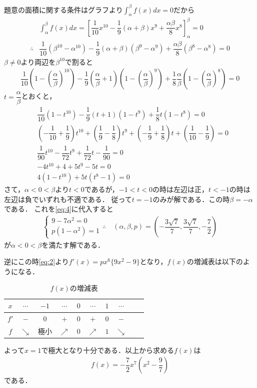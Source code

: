 \documentclass[../../main.tex]{subfiles}
\begin{document}
題意の面積に関する条件はグラフより$\displaystyle \int_\alpha^\beta f(x)dx=0$だから
\begin{align}
  &\int_\alpha^\beta f(x)dx
  =  \left[\dfrac{1}{10}x^{10}-\dfrac{1}{9}(\alpha+\beta)x^9+\dfrac{\alpha\beta}{8}x^8\right]_\alpha^\beta =0 \\
  \therefore
  & \dfrac{1}{10}(\beta^{10}-\alpha^{10})-\dfrac{1}{9}(\alpha+\beta)(\beta^9-\alpha^9)+\dfrac{\alpha\beta}{8}(\beta^8-\alpha^8)=0
\end{align}
$\beta\neq 0$より両辺を$\beta^{10}$で割ると
\begin{align}
  \dfrac{1}{10}(1-\left(\dfrac{\alpha}{\beta}\right)^{10})-\dfrac{1}{9}(\dfrac{\alpha}{\beta}+1)(1-\left(\dfrac{\alpha}{\beta}\right)^{9})+\dfrac{1}{8}\dfrac{\alpha}{\beta}(1-\left(\dfrac{\alpha}{\beta}\right)^{8})=0
\end{align}
$t=\dfrac{\alpha}{\beta}$とおくと，
\begin{align}
  & \dfrac{1}{10}(1-t^{10})-\dfrac{1}{9}(t+1)(1-t^{9})+\dfrac{1}{8}t(1-t^{8})=0 \\
  & \left(-\dfrac{1}{10}+\dfrac{1}{9}\right)t^{10} +\left(\dfrac{1}{9}-\dfrac{1}{8}\right)t^{9}+\left(-\dfrac{1}{9}+\dfrac{1}{8}\right)t +\left(\dfrac{1}{10}-\dfrac{1}{9}\right) = 0 \\
  & \dfrac{1}{90}t^{10} - \dfrac{1}{72}t^{9} + \dfrac{1}{72}t - \dfrac{1}{90} = 0 \\
  & -4t^{10}+4+5t^9-5t=0 \\
  & 4(1-t^{10})+5t(t^8-1)=0
\end{align}
さて，$\alpha<0<\beta$より$t<0$であるが，$-1<t<0$の時は左辺は正，$t<-1$の時は左辺は負でいずれも不適である．
従って$t=-1$のみが解である．この時$\beta=-\alpha$である．
これを\cref{eq:4}に代入すると
\begin{align}
  \begin{cases}
    9-7\alpha^2=0 \\
    p(1-\alpha^2)=1
  \end{cases}
  \therefore\
  & (\alpha,\beta,p)=\left(-\dfrac{3\sqrt{7}}{7},\dfrac{3\sqrt{7}}{7},-\dfrac{7}{2}\right)
\end{align}
が$\alpha<0<\beta$を満たす解である．

逆にこの時\cref{eq:2}より$f'(x)=px^6\{9x^2-9\}$となり，$f(x)$の増減表は以下のようになる．

\begin{table}[htb]
  \centering
  \caption{$f(x)$の増減表}
  \begin{tabular}{c|ccccccccc}
    $x$ & $\cdots$ & $-1$ & $\cdots$ & $0$ & $\cdots$ & $1$ & $\cdots$ \\
    \hline
    $f'$ & $-$ & $0$ & $+$ & $0$ & $+$ & $0$ & $-$ \\
    \hline
    $f$ & $\searrow$ & 極小 & $\nearrow$ & $0$ & $\nearrow$ & $1$ & $\searrow$
  \end{tabular}
\end{table}

よって$x=1$で極大となり十分である．以上から求める$f(x)$は
\begin{align}
  f(x)=-\dfrac{7}{2}x^7\left(x^2-\dfrac{9}{7}\right)
\end{align}
である．

\newpage
\end{document}

